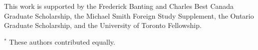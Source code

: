 \documentclass[12pt]{ut-thesis}
\begin{document}
\begin{preliminary}
\begin{acknowledgements}
This work is supported by the Frederick Banting and Charles Best Canada Graduate Scholarship, the Michael Smith Foreign Study Supplement, the Ontario Graduate Scholarship, and the University of Toronto Fellowship.
\end{acknowledgements}

{
\singlespacing
\small

\tableofcontents

\listoftables

\listoffigures

\glsaddall
\printglossary[type=\acronymtype,title=Abbreviations,nonumberlist]
}

\end{preliminary}












{
\singlespacing
\small


\vspace*{-10em}
\bigskip
$^*$ These authors contributed equally.

\clearpage

\clearpage


}
\end{document}
